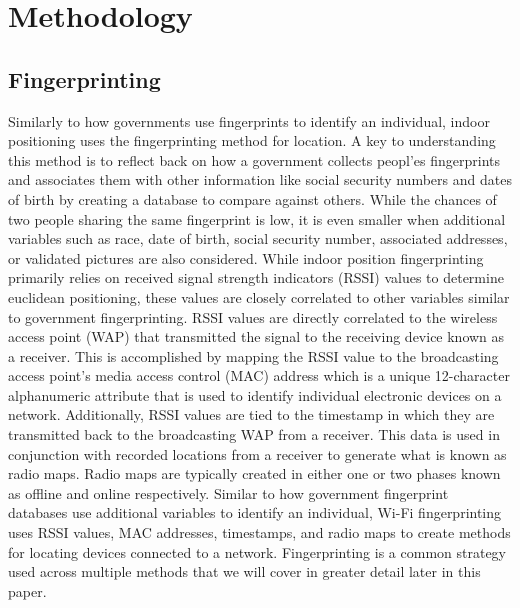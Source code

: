 \documentclass[12pt, conference]{IEEEtran}
\begin{document}
\section{Methodology}

\subsection{Fingerprinting}
Similarly to how governments use fingerprints to identify an individual, indoor positioning uses the fingerprinting method for location. A key to understanding this method is to reflect back on how a government collects peopl'es fingerprints and associates them with other information like social security numbers and dates of birth by creating a database to compare against others. While the chances of two people sharing the same fingerprint is low, it is even smaller when additional variables such as race, date of birth, social security number, associated addresses, or validated pictures are also considered. While indoor position fingerprinting primarily relies on received signal strength indicators (RSSI) values to determine euclidean positioning, these values are closely correlated to other variables similar to government fingerprinting. RSSI values are directly correlated to the wireless access point (WAP) that transmitted the signal to the receiving device known as a receiver. This is accomplished by mapping the RSSI value to the broadcasting access point's media access control (MAC) address which is a unique 12-character alphanumeric attribute that is used to identify individual electronic devices on a network. Additionally, RSSI values are tied to the timestamp in which they are transmitted back to the broadcasting WAP from a receiver. This data is used in conjunction with recorded locations from a receiver to generate what is known as radio maps. Radio maps are typically created in either one or two phases known as offline and online respectively. Similar to how government fingerprint databases use additional variables to identify an individual, Wi-Fi fingerprinting uses RSSI values, MAC addresses, timestamps, and radio maps to create methods for locating devices connected to a network. Fingerprinting is a common strategy used across multiple methods that we will cover in greater detail later in this paper.
\end{document}
